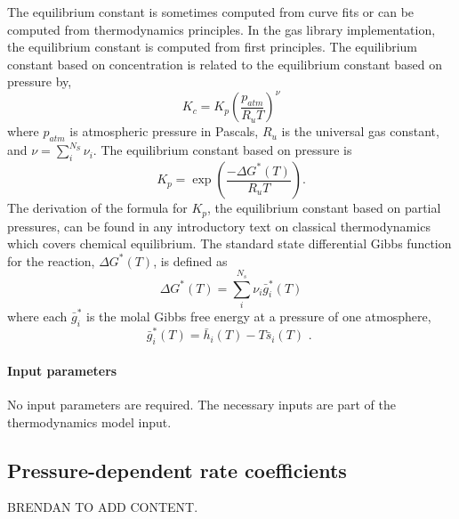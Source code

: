 The equilibrium constant is sometimes computed from curve fits
or can be computed from thermodynamics principles.
In the gas library implementation, the equilibrium constant
is computed from first principles.
The equilibrium constant based on concentration is related to the equilibrium constant
based on pressure by,
\begin{equation}
K_c = K_p \left( \frac{p_{atm}}{R_uT} \right)^{\nu}
\end{equation}
where $p_{atm}$ is atmospheric pressure in Pascals, $R_u$ is the universal
gas constant, and $\nu = \sum_i^{N_S} \nu_i$.
The equilibrium constant based on pressure is
\begin{equation}
K_p = \exp{\left( \frac{-\Delta G^*(T)}{R_uT} \right) }.
\end{equation}
The derivation of the formula for $K_p$,
the equilibrium constant based on partial pressures,
can be found in any introductory text on classical thermodynamics
which covers chemical equilibrium.
The standard state differential Gibbs function for the reaction,
$\Delta G^*(T)$, is defined as
\begin{equation}
\Delta G^*(T) = \sum_i^{N_s} \nu_i \bar{g}_i^*(T)
\end{equation}
where each $\bar{g}_i^*$ is the molal Gibbs free energy 
at a pressure of one atmosphere,
\begin{equation}
\bar{g}_i^*(T) = \bar{h}_i(T) - T \bar{s}_i(T) \text{ . }
\end{equation}

\paragraph{Input parameters}
No input parameters are required.
The necessary inputs are part of the thermodynamics
model input.

\subsection{Pressure-dependent rate coefficients}

BRENDAN TO ADD CONTENT.


